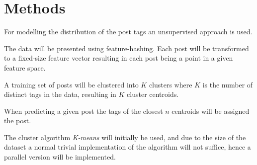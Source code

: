 
\section{Methods}

For modelling the distribution of the post tags an unsupervised approach is used.

The data will be presented using feature-hashing. Each post will be
transformed to a fixed-size feature vector resulting in each post being a point
in a given feature space.

A training set of posts will be clustered into $K$ clusters where $K$ is the
number of distinct tags in the data, resulting in $K$ cluster centroids.

When predicting a given post the tags of the closest $n$ centroids will be
assigned the post.

The cluster algorithm \textit{K-means} will initially be used, and due to the
size of the dataset a normal trivial implementation of the algorithm will not
suffice, hence a parallel version will be implemented.
